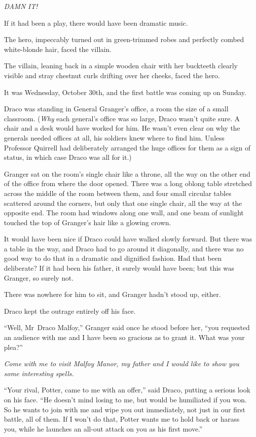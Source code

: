 \emph{DAMN IT!}

\later

If it had been a play, there would have been dramatic music.

The hero, impeccably turned out in green-trimmed robes and perfectly combed white-blonde hair, faced the villain.

The villain, leaning back in a simple wooden chair with her buckteeth clearly visible and stray chestnut curls drifting over her cheeks, faced the hero.

It was Wednesday, October 30th, and the first battle was coming up on Sunday.

Draco was standing in General Granger’s office, a room the size of a small classroom. (\emph{Why} each general’s office was so large, Draco wasn’t quite sure. A chair and a desk would have worked for him. He wasn’t even clear on why the generals needed offices at all, his soldiers knew where to find him. Unless Professor Quirrell had deliberately arranged the huge offices for them as a sign of status, in which case Draco was all for it.)

Granger sat on the room’s single chair like a throne, all the way on the other end of the office from where the door opened. There was a long oblong table stretched across the middle of the room between them, and four small circular tables scattered around the corners, but only that one single chair, all the way at the opposite end. The room had windows along one wall, and one beam of sunlight touched the top of Granger’s hair like a glowing crown.

It would have been nice if Draco could have walked slowly forward. But there was a table in the way, and Draco had to go around it diagonally, and there was no good way to do that in a dramatic and dignified fashion. Had that been deliberate? If it had been his father, it surely would have been; but this was Granger, so surely not.

There was nowhere for him to sit, and Granger hadn’t stood up, either.

Draco kept the outrage entirely off his face.

“Well, Mr~Draco Malfoy,” Granger said once he stood before her, “you requested an audience with me and I have been so gracious as to grant it. What was your plea?”

\emph{Come with me to visit Malfoy Manor, my father and I would like to show you some interesting spells.}

“Your rival, Potter, came to me with an offer,” said Draco, putting a serious look on his face.
“He doesn’t mind losing to me, but would be humiliated if you won. So he wants to join with me and wipe you out immediately, not just in our first battle, all of them. If I won’t do that, Potter wants me to hold back or harass you, while he launches an all-out attack on you as his first move.”

